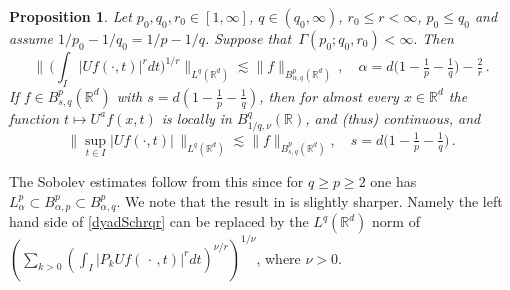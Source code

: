 \documentclass[11pt]{amsart}
\newtheorem{proposition}[theorem]{Proposition}
\theoremstyle{definition}
\numberwithin{theorem}{section}
\numberwithin{definition}{section}
\numberwithin{equation}{section}
\renewcommand{\le}{\leqslant}
\renewcommand{\ge}{\geqslant}
\def\lc{\lesssim}
\def\bbR{{\mathbb {R}}}
\renewcommand{\le}{\leqslant}
\renewcommand{\ge}{\geqslant}
\begin{document}
\begin{proposition}\label{combin} Let $p_0,q_0,r_0\in [1,\infty]$,
$q\in(q_0,\infty)$, $r_0\le r<\infty$, $p_0\le q_0$ and assume
$1/p_0-1/q_0=1/p-1/q$.
Suppose that
$\,\Gamma(p_0;q_0,r_0)<\infty.$
Then
\begin{equation}
\label{dyadSchrqr}
\Big\|\, \Big(\int_I|U\!f(\cdot,t) |^r dt\Big)^{1/r}
\Big\|_{L^q(\mathbb{R}^d)} \lc
\|f\|_{B^p_{\alpha,q}(\bbR^d)}\,,
\quad
\alpha=d\big(1-\tfrac 1p-\tfrac 1q\big)-\tfrac 2r\, .
\end{equation}
If $f\in B^p_{s,q}(\bbR^d)$ with $s=d(1-\tfrac 1p-\tfrac 1q)$, then for almost every $x\in \bbR^d$ the function
$t\mapsto U^a f(x,t)$ is  locally in $B^q_{1/q,\nu}(\bbR)$, and (thus)
continuous, and
\begin{equation*}
\big\|\sup_{t\in I} |U \!f(\cdot,t)|\,  \big\|_{L^q(\bbR^d)}
 \lc
\|f\|_{B^p_{s,q}(\bbR^d)}, \quad s=d\big(1-\tfrac 1p-\tfrac 1q\big)\,.
\end{equation*}
\end{proposition}

The  Sobolev estimates follow from this since for $q\ge p\ge 2$ one has
$L^p_\alpha\subset B^p_{\alpha,p} \subset B^p_{\alpha,q}$. We note that the result in \cite{lerose} is slightly sharper. Namely the left hand side of
\eqref{dyadSchrqr} can be replaced by the $L^q(\bbR^d)$ norm of
$(\sum_{k>0} (\int_I |P_k U\!f(\,\cdot\,,t) |^r dt)^{\nu/r})^{1/\nu}$, where $\nu>0$.
\end{document}
